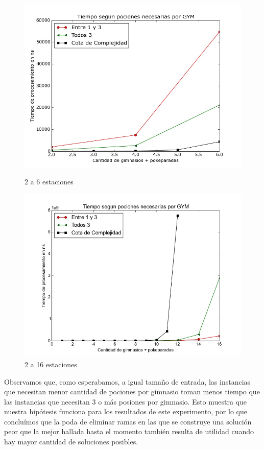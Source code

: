  \begin{figure}[H]
      \includegraphics[width=\linewidth]{imagenes/exp2_ej1_corto.jpeg}
      \caption{2 a 6 estaciones}
      \endminipage\hfill
      \includegraphics[width=\linewidth]{imagenes/exp2_ej1.jpeg}
      \caption{2 a 16 estaciones}
      \endminipage
  \end{figure}

      Observamos que, como esperabamos, a igual tamaño de entrada, las instancias que necesitan menor cantidad de pociones por gimnasio toman menos tiempo que las instancias que necesitan 3 o más posiones por gimnasio. Esto muestra que nuestra hipótesis funciona para los resultados de este experimento, por lo que concluímos que la poda de eliminar ramas en las que se construye una solución peor que la mejor hallada hasta el momento también resulta de utilidad cuando hay mayor cantidad de soluciones posibles. 

